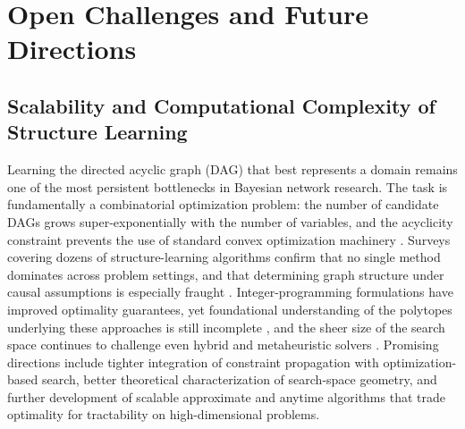 \section{Open Challenges and Future Directions}\label{sec:challenges}
\subsection{Scalability and Computational Complexity of Structure Learning}
Learning the directed acyclic graph (DAG) that best represents a domain remains one of the most persistent bottlenecks in Bayesian network research. The task is fundamentally a combinatorial optimization problem: the number of candidate DAGs grows super-exponentially with the number of variables, and the acyclicity constraint prevents the use of standard convex optimization machinery \cite{kuipers2021efficient,zhou2011structure,sun2022bayesian}. Surveys covering dozens of structure-learning algorithms confirm that no single method dominates across problem settings, and that determining graph structure under causal assumptions is especially fraught \cite{kitson2023survey}. Integer-programming formulations have improved optimality guarantees, yet foundational understanding of the polytopes underlying these approaches is still incomplete \cite{cussens2017bayesian}, and the sheer size of the search space continues to challenge even hybrid and metaheuristic solvers \cite{sun2019hybrid}. Promising directions include tighter integration of constraint propagation with optimization-based search, better theoretical characterization of search-space geometry, and further development of scalable approximate and anytime algorithms that trade optimality for tractability on high-dimensional problems.

